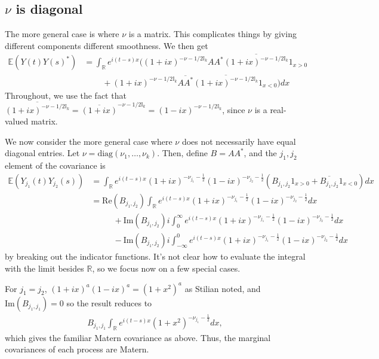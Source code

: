 \documentclass[11pt]{article}
\begin{document}

\subsection{$\nu$ is diagonal}
The more general case is where $\nu$ is a matrix. This complicates things by giving different components different smoothness. We then get \begin{align*}
\mathbb{E}(Y(t)Y(s)^*) &= \int_\mathbb{R} e^{i(t-s) x}\big((1 + ix)^{-\nu - 1/2 \mathbb{I}_k}AA^*\overline{(1 + ix)^{-\nu - 1/2 \mathbb{I}_k} }1_{x > 0} \\
& \ \ \ \ \ \ \ \ \ \ +(1 + ix)^{-\nu - 1/2 \mathbb{I}_k}\overline{AA^*}\overline{(1 +ix)^{-\nu - 1/2 \mathbb{I}_k} }1_{x < 0} \big) dx
\end{align*}Throughout, we use the fact that $\overline{(1 + ix)^{- \nu - 1/2 \mathbb{I}_k}} = \overline{(1 + ix)}^{-\nu - 1/2\mathbb{I}_k} = (1 - ix)^{-\nu - 1/2\mathbb{I}_k}$, since $\nu$ is a real-valued matrix.

We now consider the more general case where $\nu$ does not necessarily have equal diagonal entries. Let $\nu = \textrm{diag}(\nu_1, \dots, \nu_k)$.
Then, define $B = AA^*$, and the $j_1, j_2$ element of the covariance is
\begin{align*}
\mathbb{E}(Y_{j_1}(t)Y_{j_2}(s)) &= \int_{\mathbb{R}} e^{i(t-s) x} (1 + i x)^{-\nu_{j_1}- \frac{1}{2}}(1 -i x)^{-\nu_{j_2}- \frac{1}{2}}(B_{j_1, j_2}1_{x > 0} + \overline{B_{j_1, j_2}} 1_{x < 0}) dx \\
&=\textrm{Re}(B_{j_1, j_2}) \int_{\mathbb{R}} e^{i(t-s) x} (1 + i x)^{-\nu_{j_1}- \frac{1}{2}}(1 -i x)^{-\nu_{j_2}- \frac{1}{2}}dx\\
& \ \ \ \ \ \ \ \ \ \ \ \ + \textrm{Im}(B_{j_1, j_2})i\int_{0}^\infty e^{i(t-s) x} (1 + i x)^{-\nu_{j_1}- \frac{1}{2}}(1 -i x)^{-\nu_{j_2}- \frac{1}{2}}dx\\
& \ \ \ \ \ \ \ \ \ \ \ \ - \textrm{Im}(B_{j_1, j_2})i\int_{-\infty}^0 e^{i(t-s) x} (1 + i x)^{-\nu_{j_1}- \frac{1}{2}}(1 -i x)^{-\nu_{j_2}- \frac{1}{2}}dx
\end{align*}by breaking out the indicator functions. It's not clear how to evaluate the integral with the limit besides $\mathbb{R}$, so we focus now on a few special cases.

For $j_1 = j_2$, $(1 + ix)^{a} (1 - ix)^a = (1+x^2)^a$ as Stilian noted, and $\textrm{Im}(B_{j_1, j_1}) = 0$ so the result reduces to \begin{align*}
B_{j_1, j_1}\int_{\mathbb{R}} e^{i(t-s) x} (1 + x^2)^{-\nu_{j_1}- \frac{1}{2}}dx,
\end{align*}which gives the familiar Matern covariance as above. Thus, the marginal covariances of each process are Matern.
\end{document}
